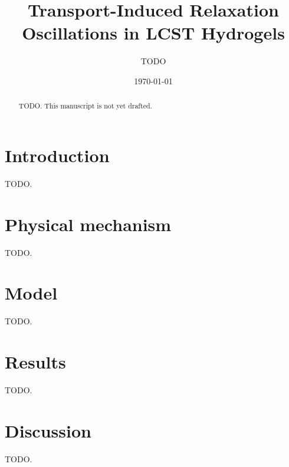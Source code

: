 \documentclass[11pt]{article}
\title{Transport-Induced Relaxation Oscillations in LCST Hydrogels}
\author{TODO}
\date{\today}
\begin{document}
\maketitle

\begin{abstract}
TODO. This manuscript is not yet drafted.
\end{abstract}

\section{Introduction}
TODO.

\section{Physical mechanism}
TODO.

\section{Model}
TODO.

\section{Results}
TODO.

\section{Discussion}
TODO.



\end{document}

